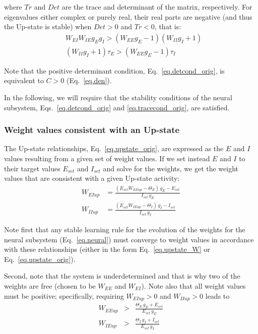 \documentclass[twocolumn]{article}
\newcommand{\EE}{\mathit{EE}}
\newcommand{\EI}{\mathit{EI}}
\newcommand{\IE}{\mathit{IE}}
\newcommand{\II}{\mathit{II}}
\newcommand{\set}{\mathit{set}}
\newcommand{\up}{\mathit{up}}
\newcommand{\De}{\mathit{Det}}
\newcommand{\Tr}{\mathit{Tr}}
\begin{document}
\noindent where $\Tr$ and $\De$ are the trace and determinant of the matrix, respectively. For eigenvalues either complex or purely real, their real parts are negative (and thus the Up-state is stable) when $\De>0$ and $\Tr<0$, that is:
\begin{eqnarray}
& W_{\EI} W_{\IE} g_E g_I > (W_{\EE} g_E - 1)(W_{\II} g_I + 1) \label{eq.detcond_orig}\\
& (W_{\II} g_I + 1)\tau_E > (W_{\EE} g_E - 1)\tau_I
\label{eq.tracecond_orig}
\end{eqnarray}

\noindent Note that the positive determinant condition, Eq.\ \ref{eq.detcond_orig}, is equivalent to $C>0$ (Eq.\ \ref{eq.den}).

In the following, we will require that the stability conditions of the neural subsystem, Eqs.\ \ref{eq.detcond_orig} and \ref{eq.tracecond_orig}, are satisfied.



\subsubsection{Weight values consistent with an Up-state}

The Up-state relationships, Eq.\ \ref{eq.upstate_orig}, are expressed as the $E$ and $I$ values resulting from a given set of weight values. If we set instead $E$ and $I$ to their target values $E_{\set}$ and $I_{\set}$ and solve for the weights, we get the weight values that are consistent with a given Up-state activity:
\begin{equation}
\begin{aligned}
W_{\EI\up} & = \frac{(E_{\set} W_{\EE\up} - \Theta_E) \, g_E - E_{\set}}{I_{\set} \, g_E} \\
W_{\II\up} & = \frac{(E_{\set} W_{\IE\up} - \Theta_I) \, g_I - I_{\set}}{I_{\set} \, g_I}
\end{aligned}
\label{eq.upstate_W}
\end{equation}

\noindent Note first that any stable learning rule for the evolution of the weights for the neural subsystem (Eq.\ \ref{eq.neural}) must converge to weight values in accordance with these relationships (either in the form Eq.\ \ref{eq.upstate_W} or Eq.\ \ref{eq.upstate_orig}).

Second, note that the system is underdetermined and that is why two of the weights are free (chosen to be $W_{\EE}$ and $W_{\EI}$). Note also that all weight values must be positive; specifically, requiring $W_{\EI\up}>0$ and $W_{\II\up}>0$ leads to
\begin{eqnarray}
W_{\EE\up} & > & \frac{\Theta_E \, g_E + E_{\set}}{E_{\set} \, g_E}
\label{eq.positive_WEI} \\
W_{\IE\up} & > & \frac{\Theta_I \, g_I + I_{\set}}{E_{\set} \, g_I}
\label{eq.positive_WII}
\end{eqnarray}
\end{document}
